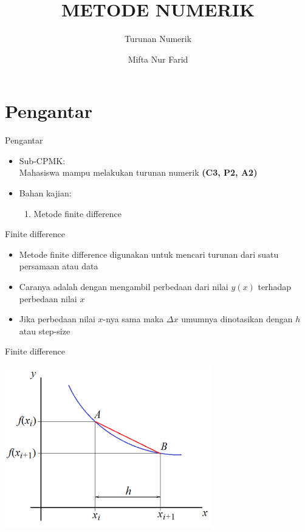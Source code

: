 \documentclass[pdflatex,compress,mathserif]{beamer}
\title{METODE NUMERIK}
\subtitle{Turunan Numerik}
\author{Mifta Nur Farid}
\begin{document}
\maketitle

\section{Pengantar}

\begin{frame}{Pengantar}
    \begin{itemize}
        \item Sub-CPMK:\\ Mahasiswa mampu melakukan turunan numerik \textbf{(C3, P2, A2)}
    \end{itemize}
    \begin{itemize}
        \item Bahan kajian:
        \begin{enumerate}
            \item Metode finite difference
        \end{enumerate}
    \end{itemize}
\end{frame}

\begin{frame}{Finite difference}
    \begin{itemize}
        \item Metode finite difference digunakan untuk mencari turunan dari suatu persamaan atau data
        \item Caranya adalah dengan mengambil perbedaan dari nilai $y(x)$ terhadap perbedaan nilai $x$
        \item Jika perbedaan nilai $x$-nya sama maka $\Delta x$ umumnya dinotasikan dengan $h$ atau step-size
    \end{itemize}
\end{frame}

\begin{frame}{Finite difference}
    \begin{center}
        \includegraphics[width=0.8\linewidth]{img/img01}
    \end{center}
\end{frame}
\end{document}
